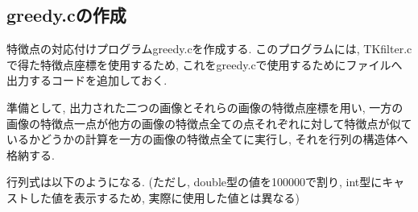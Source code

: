 \documentclass[a4j]{jarticle}
\begin{document}
\subsection{greedy.cの作成}
特徴点の対応付けプログラムgreedy.cを作成する.
このプログラムには, TKfilter.cで得た特徴点座標を使用するため, 
これをgreedy.cで使用するためにファイルへ出力するコードを追加しておく.

準備として, 出力された二つの画像とそれらの画像の特徴点座標を用い, 一方の画像の特徴点一点が他方の画像の特徴点全ての点それぞれに対して特徴点が似ているかどうかの計算を一方の画像の特徴点全てに実行し, それを行列の構造体へ格納する.

行列式は以下のようになる. (ただし, double型の値を100000で割り, int型にキャストした値を表示するため, 実際に使用した値とは異なる)
\end{document}
